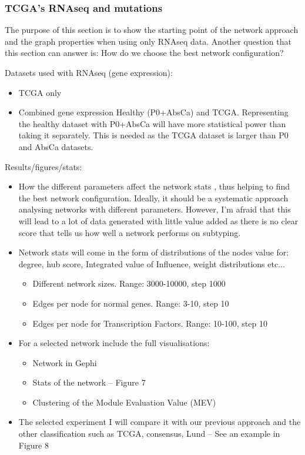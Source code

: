 \subsubsection{TCGA's RNAseq and mutations}


The purpose of this section is to show the starting point of the network approach and the graph properties when using only RNAseq data. Another question that this section can answer is: How do we choose the best network configuration?

Datasets used with RNAseq (gene expression):
\begin{itemize}

    \item TCGA only
    \item Combined gene expression Healthy (P0+AbsCa) and TCGA. Representing the healthy dataset with P0+AbsCa will have more statistical power than taking it separately. This is needed as the TCGA dataset is larger than P0 and AbsCa datasets.
\end{itemize}

Results/figures/stats:
\begin{itemize}

    \item How the different parameters affect the network stats , thus helping to find the best network configuration. Ideally, it should be a systematic approach analysing networks with different parameters. However, I’m afraid that this will lead to a lot of data generated with little value added as there is no clear score that tells us how well a network performs on subtyping.
    \item Network stats will come in the form of distributions of the nodes value for: degree, hub score, Integrated value of Influence, weight distributions etc...
          \begin{itemize}
              \item Different network sizes. Range: 3000-10000, step 1000
              \item Edges per node for normal genes. Range: 3-10, step 10
              \item Edges per node for Transcription Factors. Range: 10-100, step 10
          \end{itemize}
    \item For a selected network include the full visualisations:
          \begin{itemize}

              \item Network in Gephi
              \item Stats of the network – Figure 7
              \item Clustering of the Module Evaluation Value (MEV)
          \end{itemize}

    \item The selected experiment I will compare it with our previous approach and the other classification such as TCGA, consensus, Lund – See an example in Figure 8
\end{itemize}


